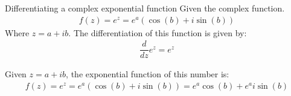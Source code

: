 \begin{theorem}{Differentiating a complex exponential function}{}
Given the complex function.
\begin{align}
f(z)=e^{z}=e^{a}(\cos(b)+i\sin(b))
\end{align}
Where $z=a+ib$. The differentiation of this function is given by:
\begin{align}
\dfrac{d}{dz}e^{z}=e^{z}
\end{align}
\end{theorem}
\begin{prof}{}{}
Given $z=a+ib$, the exponential function of this number is:
\begin{align}
f(z)=e^{z}=e^{a}(\cos(b)+i\sin(b))=e^{a}\cos(b)+e^{a}i\sin(b)
\end{align}
\end{prof}
